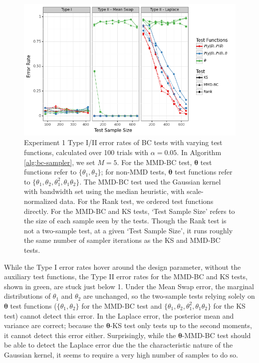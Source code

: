 \documentclass[a4paper,11pt]{article}
\begin{document}
\begin{figure}
    \centering
    \includegraphics[width=\textwidth]{figures/gandy_scott_aux.png}
    \caption{Experiment 1 Type I/II error rates of BC tests with varying test functions, calculated over 100 trials with $\alpha=0.05$. In Algorithm \ref{alg:bc-sampler}, we set $M=5$. For the MMD-BC test, $\mathbf{\theta}$ test functions refer to $\{\theta_{1}, \theta_{2}\}$; for non-MMD tests, $\mathbf{\theta}$ test functions refer to $\{\theta_{1}, \theta_{2}, \theta_{1}^{2}, \theta_{1}\theta_{2}\}$. The MMD-BC test used the Gaussian kernel with bandwidth set using the median heuristic, with scale-normalized data. For the Rank test, we ordered test functions directly. For the MMD-BC and KS tests, `Test Sample Size' refers to the size of each sample seen by the tests. Though the Rank test is not a two-sample test, at a given `Test Sample Size', it runs roughly the same number of sampler iterations as the KS and MMD-BC tests.}
    \label{fig:ex1_aux}
\end{figure}

While the Type I error rates hover around the design parameter, without the auxiliary test functions, the Type II error rates for the MMD-BC and KS tests, shown in green, are stuck just below 1. Under the Mean Swap error, the marginal distributions of $\theta_{1}$ and $\theta_{2}$ are unchanged, so the two-sample tests relying solely on $\mathbf{\theta}$ test functions ($\{\theta_{1}, \theta_{2}\}$ for the MMD-BC test and $\{\theta_{1}, \theta_{2}, \theta_{1}^{2}, \theta_{1}\theta_{2}\}$ for the KS test) cannot detect this error. In the Laplace error, the posterior mean and variance are correct; because the $\mathbf{\theta}$-KS test only tests up to the second moments, it cannot detect this error either. Surprisingly, while the $\mathbf{\theta}$-MMD-BC test should be able to detect the Laplace error due the the characteristic nature of the Gaussian kernel, it seems to require a very high number of samples to do so.
\end{document}
